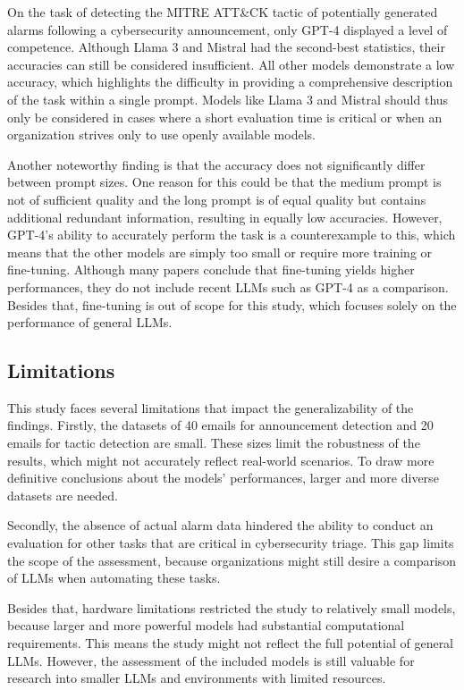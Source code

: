 On the task of detecting the MITRE ATT\&CK tactic of potentially generated alarms following a cybersecurity
announcement, only GPT-4 displayed a level of competence.
Although Llama 3 and Mistral had the second-best statistics, their accuracies can still be considered insufficient.
All other models demonstrate a low accuracy, which highlights the difficulty in providing a comprehensive description
of the task within a single prompt.
Models like Llama 3 and Mistral should thus only be considered in cases where a short evaluation time is critical or
when an organization strives only to use openly available models.

Another noteworthy finding is that the accuracy does not significantly differ between prompt sizes.
One reason for this could be that the medium prompt is not of sufficient quality and the long prompt is of equal quality
but contains additional redundant information, resulting in equally low accuracies.
However, GPT-4's ability to accurately perform the task is a counterexample to this, which means that the other models
are simply too small or require more training or fine-tuning.
Although many papers conclude that fine-tuning yields higher performances, they do not include recent LLMs such as
GPT-4 as a comparison.
Besides that, fine-tuning is out of scope for this study, which focuses solely on the performance of general LLMs.

\subsection{Limitations}
\label{subsec:limitations}

This study faces several limitations that impact the generalizability of the findings.
Firstly, the datasets of 40 emails for announcement detection and 20 emails for tactic detection are small.
These sizes limit the robustness of the results, which might not accurately reflect real-world scenarios.
To draw more definitive conclusions about the models' performances, larger and more diverse datasets are needed.

Secondly, the absence of actual alarm data hindered the ability to conduct an evaluation for other tasks that are
critical in cybersecurity triage.
This gap limits the scope of the assessment, because organizations might still desire a comparison of LLMs when
automating these tasks.

Besides that, hardware limitations restricted the study to relatively small models, because larger and more powerful
models had substantial computational requirements.
This means the study might not reflect the full potential of general LLMs.
However, the assessment of the included models is still valuable for research into smaller LLMs and environments
with limited resources.

